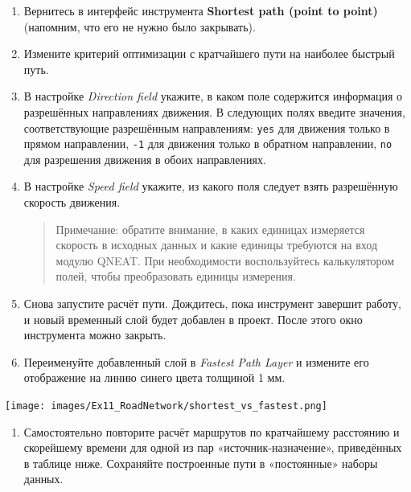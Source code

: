 \documentclass[
  12pt,
]{book}
\providecommand{\tightlist}{%
  \setlength{\itemsep}{0pt}\setlength{\parskip}{0pt}}
\begin{document}
\begin{enumerate}
\def\labelenumi{\arabic{enumi}.}
\setcounter{enumi}{11}
\item
  Вернитесь в интерфейс инструмента \textbf{Shortest path (point to point)} (напомним, что его не нужно было закрывать).
\item
  Измените критерий оптимизации с кратчайшего пути на наиболее быстрый путь.
\item
  В настройке \emph{Direction field} укажите, в каком поле содержится информация о разрешённых направлениях движения. В следующих полях введите значения, соответствующие разрешённым направлениям: \texttt{yes} для движения только в прямом направлении, \texttt{-1} для движения только в обратном направлении, \texttt{no} для разрешения движения в обоих направлениях.
\item
  В настройке \emph{Speed field} укажите, из какого поля следует взять разрешённую скорость движения.

  \begin{quote}
  Примечание: обратите внимание, в каких единицах измеряется скорость в исходных данных и какие единицы требуются на вход модулю QNEAT. При необходимости воспользуйтесь калькулятором полей, чтобы преобразовать единицы измерения.
  \end{quote}
\item
  Снова запустите расчёт пути. Дождитесь, пока инструмент завершит работу, и новый временный слой будет добавлен в проект. После этого окно инструмента можно закрыть.
\item
  Переименуйте добавленный слой в \emph{Fastest Path Layer} и измените его отображение на линию синего цвета толщиной 1 мм.
\end{enumerate}

\texttt{[image: images/Ex11\_RoadNetwork/shortest\_vs\_fastest.png]}

\begin{enumerate}
\def\labelenumi{\arabic{enumi}.}
\setcounter{enumi}{17}
\tightlist
\item
  Самостоятельно повторите расчёт маршрутов по кратчайшему расстоянию и скорейшему времени для одной из пар «источник-назначение», приведённых в таблице ниже. Сохраняйте построенные пути в «постоянные» наборы данных.
\end{enumerate}
\end{document}
